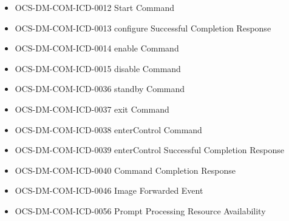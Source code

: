 \begin{itemize}
\item OCS-DM-COM-ICD-0012 Start Command
\item OCS-DM-COM-ICD-0013 configure Successful Completion Response
\item OCS-DM-COM-ICD-0014 enable Command
\item OCS-DM-COM-ICD-0015 disable Command
\item OCS-DM-COM-ICD-0036 standby Command
\item OCS-DM-COM-ICD-0037 exit Command
\item OCS-DM-COM-ICD-0038 enterControl Command
\item OCS-DM-COM-ICD-0039 enterControl Successful Completion Response
\item OCS-DM-COM-ICD-0040 Command Completion Response
\item OCS-DM-COM-ICD-0046 Image Forwarded Event
\item OCS-DM-COM-ICD-0056 Prompt Processing Resource Availability
\end{itemize}
